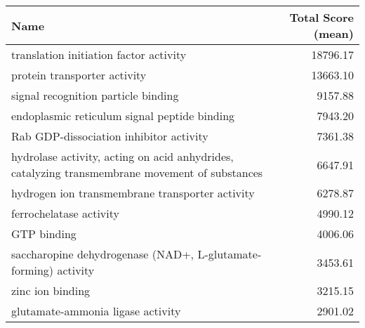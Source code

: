 \begin{table}[h]
\begin{center} \sf
\begin{tabular}{p{}r}
\toprule
\textbf{Name}                                                                                  & \textbf{Total Score (mean)} \\ \midrule
translation initiation factor activity                                                         & 18796.17                    \\ %
protein transporter activity                                                                   & 13663.10                    \\
signal recognition particle binding                                                            & 9157.88                     \\
endoplasmic reticulum signal peptide binding                                                   & 7943.20                     \\ %
Rab GDP-dissociation inhibitor activity                                                        & 7361.38                     \\
hydrolase activity, acting on acid anhydrides, catalyzing transmembrane movement of substances & 6647.91                     \\
hydrogen ion transmembrane transporter activity                                                & 6278.87                     \\
ferrochelatase activity                                                                        & 4990.12                     \\
GTP binding                                                                                    & 4006.06                     \\
saccharopine dehydrogenase (NAD+, L-glutamate-forming) activity                                & 3453.61                     \\
zinc ion binding                                                                               & 3215.15                     \\
glutamate-ammonia ligase activity                                                              & 2901.02                     \\

\end{tabular}
\end{center}
\end{table}
